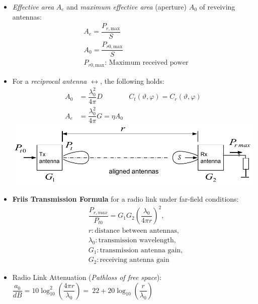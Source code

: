     \begin{itemize}
    \item \textit{Effective area} $A_e$ and \textit{maximum effective area} (aperture) $A_0$ of reveiving antennas:\\
        \begin{align*}
            &A_e = \dfrac{P_{r,\mathrm{max}}}{S}\\
            &A_0 = \dfrac{P_{r0,\mathrm{max}}}{S}\\
            &P_{r0,\mathrm{max}}\text{: Maximum received power}
        \end{align*}
    \item For a \textit{reciprocal antenna} $\leftrightarrow$, the following holds:
        \begin{align*}
            A_0 &= \dfrac{\lambda_0^2}{4\pi} D &C_t(\vartheta, \varphi) = C_r(\vartheta, \varphi)\\
            A_e &= \dfrac{\lambda_0^2}{4\pi} G = \eta A_0&
        \end{align*}
    \includegraphics[width=.3\paperheight]{content/aawp/pictures/friis_transmission.png}
    \item \textbf{Friis Transmission Formula} for a radio link under far-field conditions:
        \begin{align*}
            &\dfrac{P_{r,max}}{P_{t0}} = G_1 G_2 \left(\dfrac{\lambda_0}{4\pi r} \right)^2,\\
            &r: \text{distance between antennas},\\
            &\lambda_0: \text{transmission wavelength},\\
            &G_1: \text{transmission antenna gain},\\
            &G_2: \text{receiving antenna gain}
        \end{align*}
    \item Radio Link Attenuation (\textit{Pathloss of free space}):\\
        \(\dfrac{a_0}{\si{dB}} = 10 \log_{10}^2\left(\dfrac{4 \pi r}{\lambda_0}\right) =\
        22 + 20 \log_{10}\left(\dfrac{r}{\lambda_0}\right)\)
\end{itemize}


